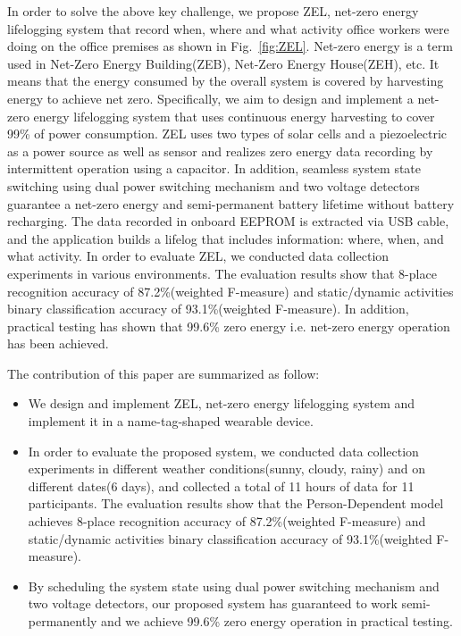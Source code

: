 \documentclass[conference]{IEEEtran}
\begin{document}
In order to solve the above key challenge, we propose ZEL, net-zero energy lifelogging system that record when, where and what activity office workers were doing on the office premises as shown in Fig.~\ref{fig:ZEL}.
Net-zero energy is a term used in Net-Zero Energy Building(ZEB)\cite{ZeroEner14:online}, Net-Zero Energy House(ZEH), etc.
It means that the energy consumed by the overall system is covered by harvesting energy to achieve net zero.
Specifically, we aim to design and implement a net-zero energy lifelogging system that uses continuous energy harvesting to cover 99\% of power consumption.
ZEL uses two types of solar cells and a piezoelectric as a power source as well as sensor and realizes zero energy data recording by intermittent operation using a capacitor.
In addition, seamless system state switching using dual power switching mechanism and two voltage detectors guarantee a net-zero energy and semi-permanent battery lifetime without battery recharging.
The data recorded in onboard EEPROM is extracted via USB cable, and the application builds a lifelog that includes information: where, when, and what activity.
In order to evaluate ZEL, we conducted data collection experiments in various environments.
The evaluation results show that 8-place recognition accuracy of 87.2\%(weighted F-measure) and static/dynamic activities binary classification accuracy of 93.1\%(weighted F-measure).
In addition, practical testing has shown that 99.6\% zero energy i.e. net-zero energy operation has been achieved.

The contribution of this paper are summarized as follow:
\begin{itemize}
    \item We design and implement ZEL, net-zero energy lifelogging system and implement it in a name-tag-shaped wearable device.
    \item In order to evaluate the proposed system, we conducted data collection experiments in different weather conditions(sunny, cloudy, rainy) and on different dates(6 days), and collected a total of 11 hours of data for 11 participants.
    The evaluation results show that the Person-Dependent model achieves 8-place recognition accuracy of 87.2\%(weighted F-measure) and static/dynamic activities binary classification accuracy of 93.1\%(weighted F-measure).
    \item By scheduling the system state using dual power switching mechanism and two voltage detectors, our proposed system has guaranteed to work semi-permanently and we achieve 99.6\% zero energy operation in practical testing.
\end{itemize}
\end{document}
